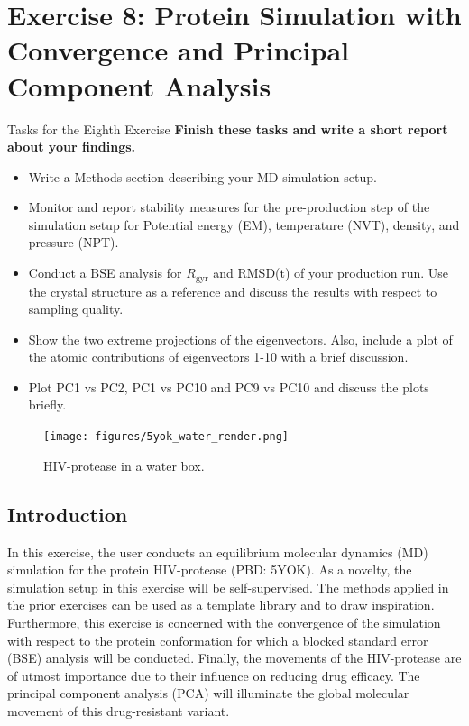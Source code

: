 \documentclass[9pt,tutorial]{livecoms}
\begin{document}
\newpage

\section{Exercise 8: Protein Simulation with Convergence and Principal Component Analysis}\label{sec:ProteinSim}
\begin{Checklists}
    \begin{checklist}{Tasks for the Eighth Exercise}
    \textbf{Finish these tasks and write a short report about your findings.}
    \begin{itemize}
		\item Write a Methods section describing your MD simulation setup.
		\item Monitor and report stability measures for the pre-production step of the simulation setup for Potential energy (EM), temperature (NVT), density, and pressure (NPT). 
		\item Conduct a BSE analysis for $R_\text{gyr}$ and RMSD(t) of your production run. Use the crystal structure as a reference and discuss the results with respect to sampling quality. 
		\item Show the two extreme projections of the eigenvectors. Also, include a plot of the atomic contributions of eigenvectors 1-10 with a brief discussion.
		\item Plot PC1 vs PC2, PC1 vs PC10 and PC9 vs PC10 and discuss the plots briefly.
	\end{itemize} 
    \end{checklist}
\end{Checklists}
\begin{figure}[H]
    \centering
    \texttt{[image: figures/5yok\_water\_render.png]}
    \caption{HIV-protease in a water box.}
    \label{fig:5yok_water_render}
\end{figure}


\subsection*{Introduction}
In this exercise, the user conducts an equilibrium molecular dynamics (MD) simulation for the protein HIV-protease (PBD: 5YOK). As a novelty, the simulation setup in this exercise will be self-supervised. The methods applied in the prior exercises can be used as a template library and to draw inspiration. Furthermore, this exercise is concerned with the convergence of the simulation with respect to the protein conformation for which a blocked standard error (BSE) analysis\cite{Grossfield_2009} will be conducted. Finally, the movements of the HIV-protease are of utmost importance due to their influence on reducing drug efficacy. The principal component analysis (PCA) will illuminate the global molecular movement of this drug-resistant variant.\cite{Yang_2008}
\end{document}
